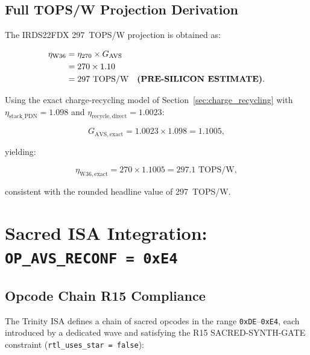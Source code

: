 \subsection{Full TOPS/W Projection Derivation}

The IRDS22FDX 297~TOPS/W projection is obtained as:

\begin{align}
  \eta_\mathrm{W36} &= \eta_{270} \times G_\mathrm{AVS} \label{eq:eta_w36} \\
  &= 270 \times 1.10 \notag \\
  &= 297 \text{ TOPS/W} \quad \textbf{(PRE-SILICON ESTIMATE)}. \notag
\end{align}

Using the exact charge-recycling model of Section~\ref{sec:charge_recycling}
with $\eta_\mathrm{stack\_PDN} = 1.098$ and $\eta_\mathrm{recycle,direct}
= 1.0023$:

\[
  G_\mathrm{AVS,exact} = 1.0023 \times 1.098 = 1.1005,
\]

yielding:

\[
  \eta_\mathrm{W36,exact} = 270 \times 1.1005 = 297.1 \text{ TOPS/W},
\]

consistent with the rounded headline value of 297~TOPS/W.

\section{Sacred ISA Integration: \texttt{OP\_AVS\_RECONF = 0xE4}}
\label{sec:sacred_isa}

\subsection{Opcode Chain R15 Compliance}

The Trinity ISA defines a chain of sacred opcodes in the range
\texttt{0xDE}--\texttt{0xE4}, each introduced by a dedicated wave
and satisfying the R15 SACRED-SYNTH-GATE constraint
(\texttt{rtl\_uses\_star = false}):

